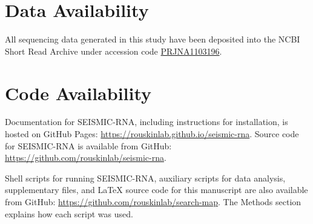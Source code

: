 \documentclass[main.tex]{subfiles}
\begin{document}
\section{Data Availability}

All sequencing data generated in this study have been deposited into the NCBI Short Read Archive under accession code \href{https://www.ncbi.nlm.nih.gov/bioproject/PRJNA1103196}{PRJNA1103196}.


\section{Code Availability}

Documentation for SEISMIC-RNA, including instructions for installation, is hosted on GitHub Pages: \url{https://rouskinlab.github.io/seismic-rna}.
Source code for SEISMIC-RNA is available from GitHub: \url{https://github.com/rouskinlab/seismic-rna}. 

Shell scripts for running SEISMIC-RNA, auxiliary scripts for data analysis, supplementary files, and LaTeX source code for this manuscript are also available from GitHub: \url{https://github.com/rouskinlab/search-map}. The Methods section explains how each script was used.
\end{document}
